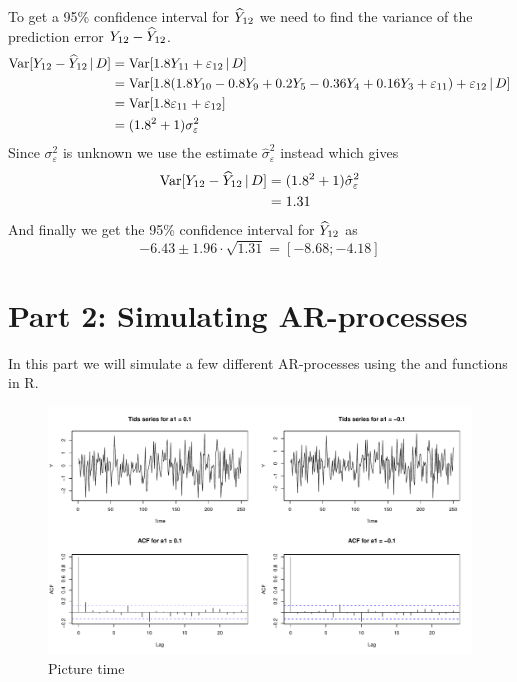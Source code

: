 To get a 95\% confidence interval for $\widehat{Y}_{12}$ we need to find the variance of the prediction error $Y_{12}-\widehat{Y}_{12}$.
\begin{align*}
    \text{Var}[Y_{12} - \widehat{Y}_{12}\,|\, D] &= \text{Var}[1.8Y_{11} + \varepsilon_{12}\,|\, D] \\
    &= \text{Var}[1.8(1.8Y_{10} - 0.8Y_9 + 0.2Y_5 -0.36Y_4 + 0.16Y_3 + \varepsilon_{11}) + \varepsilon_{12}\,|\, D] \\
    &= \text{Var}[1.8\varepsilon_{11} + \varepsilon_{12}] \\
    &= (1.8^2 + 1)\sigma^2_\varepsilon
\end{align*}
Since $\sigma^2_\varepsilon$ is unknown we use the estimate $\hat{\sigma}^2_\varepsilon$ instead which gives
\begin{align*}
    \text{Var}[Y_{12} - \widehat{Y}_{12}\,|\, D] &= (1.8^2 + 1)\hat{\sigma}^2_\varepsilon \\
    &= 1.31
\end{align*}
And finally we get the 95\% confidence interval for $\widehat{Y}_{12}$ as
\begin{equation*}
    -6.43\pm 1.96\cdot\sqrt{1.31} = [-8.68; -4.18]
\end{equation*}

\section*{Part 2: Simulating AR-processes}
In this part we will simulate a few different AR-processes using the  and  functions in R.

\begin{figure}
    \centering
    \includegraphics[width=140mm]{ar1-filter-1.pdf}
    \caption{Picture time}
    \label{fig:one}
\end{figure}

